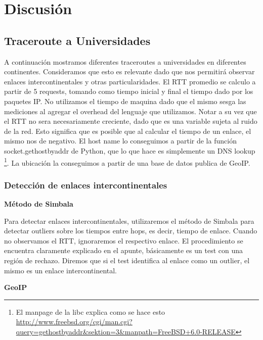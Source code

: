 \section{Discusión}

\subsection{Traceroute a Universidades}

A continuación mostramos diferentes traceroutes a universidades en diferentes continentes. Consideramos que esto es relevante dado que nos permitirá observar enlaces intercontinentales y otras particularidades. El RTT promedio se calculo a partir de 5 requests, tomando como tiempo inicial y final el tiempo dado por los paquetes IP. No utilizamos el tiempo de maquina dado que el mismo sesga las mediciones al agregar el overhead del lenguaje que utilizamos. Notar a su vez que el RTT no sera necesariamente creciente, dado que es una variable sujeta al ruido de la red. Esto significa que es posible que al calcular el tiempo de un enlace, el mismo nos de negativo. El host name lo conseguimos a partir de la función socket.gethostbyaddr de Python, que lo que hace es simplemente un DNS lookup \footnote{El manpage de la libc explica como se hace esto \url{http://www.freebsd.org/cgi/man.cgi?query=gethostbyaddr&sektion=3&manpath=FreeBSD+6.0-RELEASE}}. La ubicación la conseguimos a partir de una base de datos publica de GeoIP.

\subsubsection{Detección de enlaces intercontinentales}

\textbf{Método de Simbala}

\vspace{5px}

Para detectar enlaces intercontinentales, utilizaremos el método de Simbala \cite{cimbala2011outliers} para detectar outliers sobre los tiempos entre hops, es decir, tiempo de enlace. Cuando no observamos el RTT, ignoraremos el respectivo enlace. El procedimiento se encuentra claramente explicado en el apunte, básicamente es un test con una región de rechazo. Diremos que si el test identifica al enlace como un outlier, el mismo es un enlace intercontinental.

\vspace{10px}

\textbf{GeoIP}

